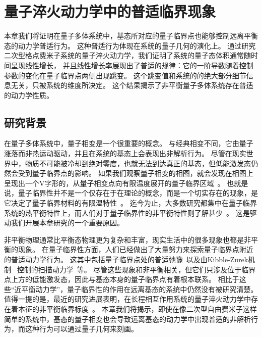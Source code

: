 
\chapter{量子淬火动力学中的普适临界现象}

	本章我们将证明在量子多体系统中，基态所对应的量子临界点也能够控制远离平衡态的动力学普适行为。
	这种普适行为体现在系统的量子几何的演化上。
	通过研究二次型格点费米子系统的量子淬火动力学，我们证明了系统的量子态体积通常随时间呈现线性增长， 并且线性增长率展现出了普适的规律：它的一阶导数随着控制参数的变化在量子临界点两侧出现跳变。
	这个跳变值和系统的的绝大部分细节信息无关，只被系统的维度所决定。
	这个结果揭示了非平衡量子多体系统存在普适的动力学性质。

	\section{研究背景}
	
		在量子多体系统中，量子相变是一个很重要的概念。
		与经典相变不同，它由量子涨落而非热运动驱动，并且在系统的基态上会表现出非解析行为。
		尽管在现实世界中，物质不可能被冷却到绝对零度，也就无法到达真正的基态，但低能激发态仍然会受到量子临界点的影响。
		如果我们观察量子相变的相图，就会发现在相图上呈现出一个V字形的，从量子相变点向有限温度展开的量子临界区域~\cite{Sachdev1999}。
		也就是说，量子临界性并不是一个仅存在于在理论的概念，而是一个切实存在的现象，是它决定了量子临界材料的有限温特性~\cite{Coleman2005}。
		迄今为止，大多数研究都集中在量子临界系统的热平衡特性上，而人们对于量子临界性的非平衡特性则了解甚少~\cite{Torre2010}。
		这是驱动我们开展本章研究的一个重要原因。
		
		非平衡物理通常比平衡态物理更为复杂和丰富，现实生活中的很多现象也都是非平衡的现象。
		在量子临界性方面，人们已经做出了大量努力来探索量子临界点附近的普适动力学行为。
		这其中包括量子临界点处的普适弛豫~\cite{Sachdev1997}以及由Kibble-Zurek机制~\cite{Kibble1976,Zurek1985} 控制的扫描动力学~\cite{Zurek2005,Dziarmaga2005,Damski2005}等。
		尽管这些现象和非平衡相关，但它们只涉及位于临界点上方的低能激发态，因此与基态本身的量子临界点有着根本联系。
		相比于这些“近平衡动力学”，量子临界性的作用在远离基态的系统中仍然没有被研究清楚。
		值得一提的是，最近的研究进展表明，在长程相互作用系统的量子淬火动力学中存在着本征的非平衡临界标度~\cite{Titum2020,De2023}。
		本章我们将揭示，即使在像二次型自由费米子这样简单的系统中，基态的量子相变也会导致远离基态的动力学中出现普适的非解析行为，而这种行为可以通过量子几何来刻画。
		
